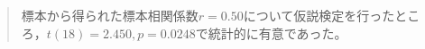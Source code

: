 \begin{quote}
	標本から得られた標本相関係数$r=0.50$について仮説検定を行ったところ，$t(18)=2.450,p=0.0248$で統計的に有意であった。
\end{quote}
